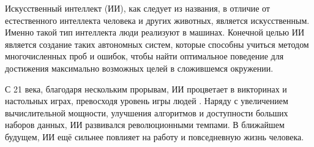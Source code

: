 Искусственный интеллект \cite{Crevier93} (ИИ), как следует из названия, в отличие от естественного интеллекта человека и других животных, является искусственным. Именно такой тип интеллекта люди реализуют в машинах.
Конечной целью ИИ является создание таких автономных систем, которые способны учиться методом многочисленных проб и ошибок, чтобы найти оптимальное поведение для достижения максимально возможных целей в сложившемся окружении. \cite{RussellAndNorvig-AI-modern-approach}

С 21 века, благодаря нескольким прорывам, ИИ процветает в викторинах и настольных играх, превосходя уровень игры людей \cite{Watson} \cite{AlphaGo}. Наряду с увеличением вычислительной мощности, улучшения алгоритмов и доступности больших наборов данных, ИИ развивался революционными темпами. В ближайшем будущем, ИИ ещё сильнее повлияет на работу и повседневную жизнь человека.




